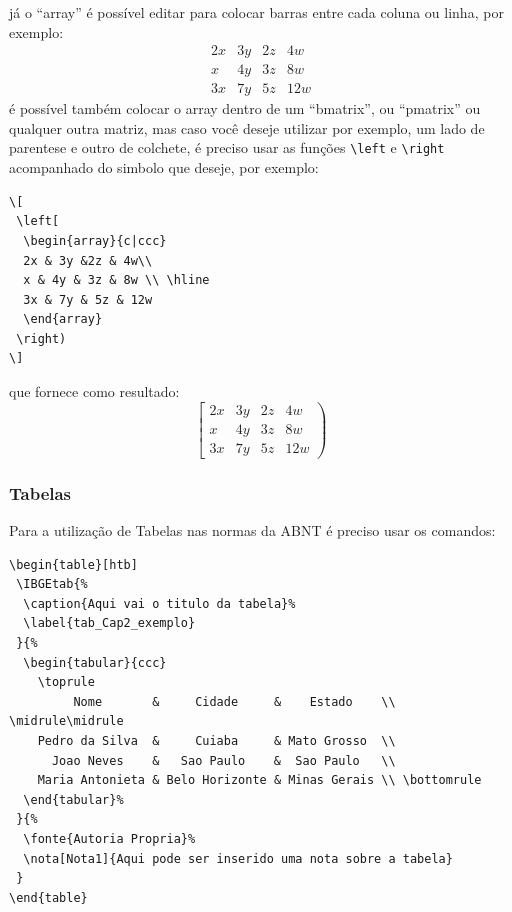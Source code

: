 já o ``array'' é possível editar para colocar barras entre cada coluna ou linha, por exemplo:
\[
\begin{array}{c|ccc}
2x & 3y &2z & 4w\\ 
x & 4y & 3z & 8w \\ \hline
3x & 7y & 5z & 12w
\end{array}
\]
é possível também colocar o array dentro de um ``bmatrix'', ou ``pmatrix'' ou qualquer outra matriz, mas caso você deseje utilizar por exemplo, um lado de parentese e outro de colchete, é preciso usar as funções \lstinline|\left| e \lstinline|\right| acompanhado do simbolo que deseje, por exemplo:
\begin{lstlisting}
\[
 \left[
  \begin{array}{c|ccc}
  2x & 3y &2z & 4w\\ 
  x & 4y & 3z & 8w \\ \hline
  3x & 7y & 5z & 12w
  \end{array}
 \right)
\]
\end{lstlisting}
que fornece como resultado:
\[
\left[
\begin{array}{c|ccc}
2x & 3y &2z & 4w\\ 
x & 4y & 3z & 8w \\ \hline
3x & 7y & 5z & 12w
\end{array}
\right)
\]

\subsubsection{Tabelas}
Para a utilização de Tabelas nas normas da ABNT é preciso usar os comandos:

\begin{lstlisting}
\begin{table}[htb]
 \IBGEtab{%
  \caption{Aqui vai o titulo da tabela}%
  \label{tab_Cap2_exemplo}
 }{%
  \begin{tabular}{ccc}
  	\toprule
  	     Nome       &     Cidade     &    Estado    \\ \midrule\midrule
  	Pedro da Silva  &     Cuiaba     & Mato Grosso  \\
  	  Joao Neves    &   Sao Paulo    &  Sao Paulo   \\
  	Maria Antonieta & Belo Horizonte & Minas Gerais \\ \bottomrule
  \end{tabular}%
 }{%
  \fonte{Autoria Propria}%
  \nota[Nota1]{Aqui pode ser inserido uma nota sobre a tabela}
 }
\end{table}
\end{lstlisting}

